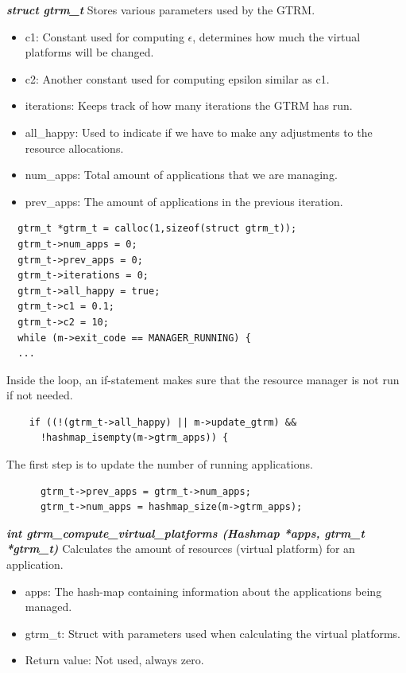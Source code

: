 \documentclass[nobiblatex]{LTHthesis}
\begin{document}
\begin{framed}
	\begin{flushleft}
			\textbf{\emph{{struct gtrm\_t}}} \newline
			Stores various parameters used by the GTRM.
			\begin{itemize}
			\item c1: Constant used for computing $\epsilon$, determines how much 
        the virtual platforms will be changed.
			\item c2: Another constant used for computing epsilon similar as c1.
			\item iterations: Keeps track of how many iterations the GTRM has run.
			\item all\_happy: Used to indicate if we have to make any adjustments 
        to the resource allocations.
			\item num\_apps: Total amount of applications that we are managing.
			\item prev\_apps: The amount of applications in the previous iteration.
			\end{itemize}
	\end{flushleft}	
\end{framed}

\begin{lstlisting}
  gtrm_t *gtrm_t = calloc(1,sizeof(struct gtrm_t));
  gtrm_t->num_apps = 0;
  gtrm_t->prev_apps = 0;
  gtrm_t->iterations = 0;
  gtrm_t->all_happy = true;
  gtrm_t->c1 = 0.1;
  gtrm_t->c2 = 10;
  while (m->exit_code == MANAGER_RUNNING) {
  ...
\end{lstlisting}
Inside the loop, an if-statement makes sure that the resource manager is not run if not needed. 
\begin{lstlisting}
    if ((!(gtrm_t->all_happy) || m->update_gtrm) && 
      !hashmap_isempty(m->gtrm_apps)) {
\end{lstlisting}

The first step is to update the number of running applications.
\begin{lstlisting}
      gtrm_t->prev_apps = gtrm_t->num_apps;
      gtrm_t->num_apps = hashmap_size(m->gtrm_apps);
\end{lstlisting}

\begin{framed}
	\begin{flushleft}
			\textbf{\emph{{int gtrm\_compute\_virtual\_platforms \newline
      (Hashmap *apps, gtrm\_t *gtrm\_t)}}} \newline
			Calculates the amount of resources (virtual platform) for an application.
			\begin{itemize}
			\item apps: The hash-map containing information about the
        applications being managed.
			\item gtrm\_t: Struct with parameters used when calculating the 
        virtual platforms.
			\item Return value: Not used, always zero.
			\end{itemize}
		\end{flushleft}	
\end{framed}
\end{document}
